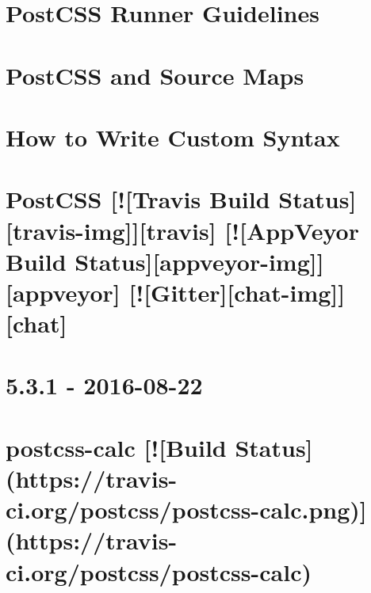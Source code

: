\documentclass[twoside]{book}
\newcommand{\+}{\discretionary{\mbox{\scriptsize$\hookleftarrow$}}{}{}}
\begin{document}
\chapter{Post\+C\+SS Runner Guidelines}
\label{md__c_1_workspace_demo_src_main_script_node_modules_postcss_docs_guidelines_runner}

\chapter{Post\+C\+SS and Source Maps}
\label{md__c_1_workspace_demo_src_main_script_node_modules_postcss_docs_source-maps}

\chapter{How to Write Custom Syntax}
\label{md__c_1_workspace_demo_src_main_script_node_modules_postcss_docs_syntax}

\chapter{Post\+C\+SS \mbox{[}!\mbox{[}Travis Build Status\mbox{]}\mbox{[}travis-\/img\mbox{]}\mbox{]}\mbox{[}travis\mbox{]} \mbox{[}!\mbox{[}App\+Veyor Build Status\mbox{]}\mbox{[}appveyor-\/img\mbox{]}\mbox{]}\mbox{[}appveyor\mbox{]} \mbox{[}!\mbox{[}Gitter\mbox{]}\mbox{[}chat-\/img\mbox{]}\mbox{]}\mbox{[}chat\mbox{]}}
\label{md__c_1_workspace_demo_src_main_script_node_modules_postcss__r_e_a_d_m_e}

\chapter{5.3.1 -\/ 2016-\/08-\/22}
\label{md__c_1_workspace_demo_src_main_script_node_modules_postcss-calc__c_h_a_n_g_e_l_o_g}

\chapter{postcss-\/calc \mbox{[}!\mbox{[}Build Status\mbox{]}(https\+://travis-\/ci.org/postcss/postcss-\/calc.png)\mbox{]}(https\+://travis-\/ci.org/postcss/postcss-\/calc)}
\label{md__c_1_workspace_demo_src_main_script_node_modules_postcss-calc__r_e_a_d_m_e}

\end{document}
